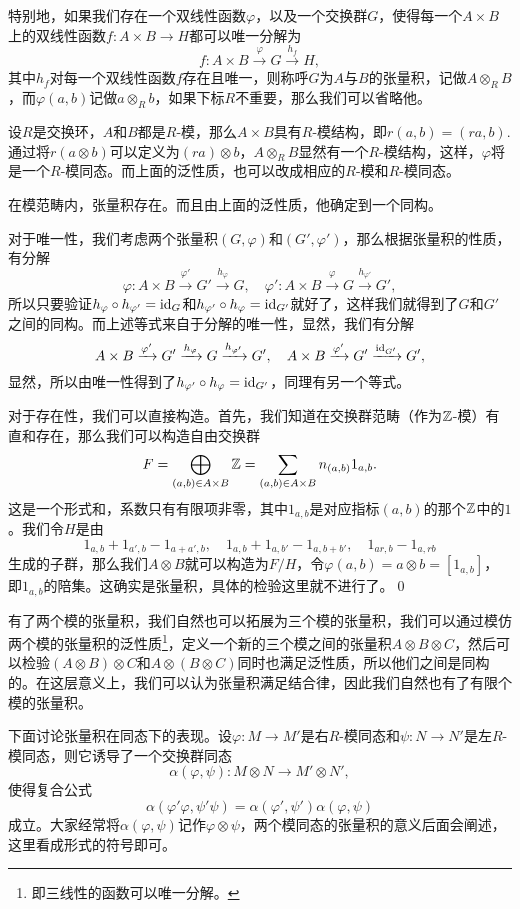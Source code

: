 特别地，如果我们存在一个双线性函数$\varphi$，以及一个交换群$G$，使得每一个$A\times B$上的双线性函数$f:A\times B\to H$都可以唯一分解为
\[
	f:A\times B\xrightarrow{\varphi} G\xrightarrow{h_f}H,
\]
其中$h_f$对每一个双线性函数$f$存在且唯一，则称呼$G$为$A$与$B$的张量积，记做$A\otimes_R B$，而$\varphi(a,b)$记做$a\otimes_R b$，如果下标$R$不重要，那么我们可以省略他。

设$R$是交换环，$A$和$B$都是$R$-模，那么$A\times B$具有$R$-模结构，即$r(a,b)=(ra,b)$. 通过将$r(a\otimes b)$可以定义为$(ra)\otimes b$，$A\otimes_R B$显然有一个$R$-模结构，这样，$\varphi$将是一个$R$-模同态。而上面的泛性质，也可以改成相应的$R$-模和$R$-模同态。

\lem 在模范畴内，张量积存在。而且由上面的泛性质，他确定到一个同构。

\proof 对于唯一性，我们考虑两个张量积$(G,\varphi)$和$(G',\varphi')$，那么根据张量积的性质，有分解
\[
	\varphi:A\times B\xrightarrow{\varphi'} G'\xrightarrow{h_{\varphi}}G,\quad \varphi':A\times B\xrightarrow{\varphi} G\xrightarrow{h_{\varphi'}}G',
\]
所以只要验证$h_\varphi\circ h_{\varphi'}=\operatorname{id}_{G}$和$h_{\varphi'}\circ h_{\varphi}=\operatorname{id}_{G'}$就好了，这样我们就得到了$G$和$G'$之间的同构。而上述等式来自于分解的唯一性，显然，我们有分解
\[
	A\times B\xrightarrow{\varphi'} G'\xrightarrow{h_{\varphi}}G\xrightarrow{h_{\varphi'}}G',\quad A\times B\xrightarrow{\varphi'} G'\xrightarrow{\operatorname{id}_{G'}}G',
\]
显然，所以由唯一性得到了$h_{\varphi'}\circ h_{\varphi}=\operatorname{id}_{G'}$，同理有另一个等式。

对于存在性，我们可以直接构造。首先，我们知道在交换群范畴（作为$\mathbb{Z}$-模）有直和存在，那么我们可以构造自由交换群
\[
	F=\bigoplus_{(a,b)\in A\times B} \mathbb{Z}=\sum_{(a,b)\in A\times B}n_{(a,b)}1_{a,b}.
\]
这是一个形式和，系数只有有限项非零，其中$1_{a,b}$是对应指标$(a,b)$的那个$\mathbb{Z}$中的$1$。我们令$H$是由
\[
	1_{a,b}+1_{a',b}-1_{a+a',b},\quad 1_{a,b}+1_{a,b'}-1_{a,b+b'},\quad 1_{ar,b}-1_{a,rb}
\]
生成的子群，那么我们$A\otimes B$就可以构造为$F/H$，令$\varphi(a,b)=a\otimes b=[1_{a,b}]$，即$1_{a,b}$的陪集。这确实是张量积，具体的检验这里就不进行了。\qed

\para 有了两个模的张量积，我们自然也可以拓展为三个模的张量积，我们可以通过模仿两个模的张量积的泛性质\footnote{即三线性的函数可以唯一分解。}，定义一个新的三个模之间的张量积$A\otimes B\otimes C$，然后可以检验$(A\otimes B)\otimes C$和$A\otimes (B\otimes C)$同时也满足泛性质，所以他们之间是同构的。在这层意义上，我们可以认为张量积满足结合律，因此我们自然也有了有限个模的张量积。

\para 下面讨论张量积在同态下的表现。设$\varphi:M\to M'$是右$R$-模同态和$\psi:N\to N'$是左$R$-模同态，则它诱导了一个交换群同态
\[
	\alpha(\varphi,\psi):M\otimes N\to M'\otimes N',
\]
使得复合公式
\[
	\alpha(\varphi'\varphi,\psi'\psi)=\alpha(\varphi',\psi')\alpha(\varphi,\psi)
\]
成立。大家经常将$\alpha(\varphi,\psi)$记作$\varphi\otimes \psi$，两个模同态的张量积的意义后面会阐述，这里看成形式的符号即可。

